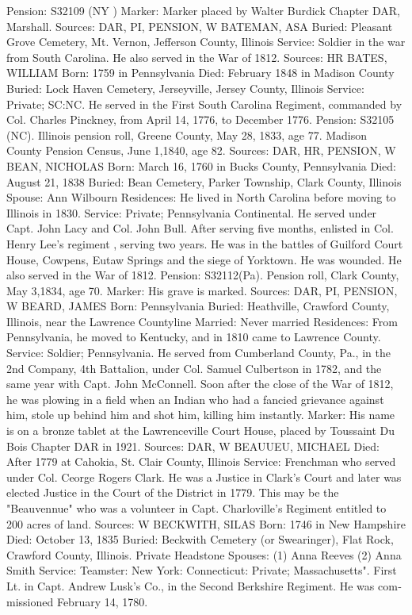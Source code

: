 Pension: S32109 (NY ) 
Marker: Marker placed by Walter Burdick Chapter DAR, Marshall. 
Sources: DAR, PI, PENSION, W 
BATEMAN, ASA 
Buried: Pleasant Grove Cemetery, Mt. Vernon, Jefferson County, Illinois 
Service: Soldier in the war from South Carolina. He also served in the War of 1812. 
Sources: HR 
BATES, WILLIAM 
Born: 1759 in Pennsylvania 
Died: February 1848 in Madison County 
Buried: Lock Haven Cemetery, Jerseyville, Jersey County, Illinois 
Service: Private; SC:NC. He served in the First South Carolina Regiment, com­manded by Col. Charles Pinckney, from April 14, 1776, to December 1776. 
Pension: S32105 (NC). Illinois pension roll, Greene County, May 28, 1833, age 77. Madison County Pension Census, June 1,1840, age 82. 
Sources: DAR, HR, PENSION, W 
BEAN, NICHOLAS 
Born: March 16, 1760 in Bucks County, Pennsylvania Died: August 21, 1838 
Buried: Bean Cemetery, Parker Township, Clark County, Illinois 
Spouse: Ann Wilbourn 
Residences: He lived in North Carolina before moving to Illinois in 1830. Service: Private; Pennsylvania Continental. He served under Capt. John Lacy and Col. John Bull. After serving five months, enlisted in Col. Henry Lee's regiment , serving two years. He was in the battles of Guilford Court House, Cowpens, Eutaw Springs and the siege of Yorktown. He was wounded. He also served in the War of 1812. 
Pension: S32112(Pa). Pension roll, Clark County, May 3,1834, age 70. 
Marker: His grave is marked. 
Sources: DAR, PI, PENSION, W 
BEARD, JAMES 
Born: Pennsylvania 
Buried: Heathville, Crawford County, Illinois, near the Lawrence Countyline 
Married: Never married 
Residences: From Pennsylvania, he moved to Kentucky, and in 1810 came to Lawrence County. 
Service: Soldier; Pennsylvania. He served from Cumberland County, Pa., in the 2nd Company, 4th Battalion, under Col. Samuel Culbertson in 1782, and the same year with Capt. John McConnell. Soon after the close of the War of 1812, he was plowing in a field when an Indian who had a fancied grievance against him, stole up behind him and shot him, killing him instantly. 
Marker: His name is on a bronze tablet at the Lawrenceville Court House, placed by Toussaint Du Bois Chapter DAR in 1921. 
Sources: DAR, W 
BEAUUEU, MICHAEL 
Died: After 1779 at Cahokia, St. Clair County, Illinois 
Service: Frenchman who served under Col. Ceorge Rogers Clark. He was a Jus­tice in Clark's Court and later was elected Justice in the Court of the District in 1779. This may be the "Beauvennue" who was a volunteer in Capt. Charloville's Regiment entitled to 200 acres of land. 
Sources: W 
BECKWITH, SILAS 
Born: 1746 in New Hampshire 
Died: October 13, 1835 
Buried: Beckwith Cemetery (or Swearinger), Flat Rock, Crawford County, Illinois. 
Private Headstone Spouses: (1) Anna Reeves 
			  (2) Anna Smith 
Service: Teamster: New York: Connecticut: Private; Massachusetts". First Lt. in Capt. Andrew Lusk's Co., in the Second Berkshire Regiment. He was com­missioned February 14, 1780. 

